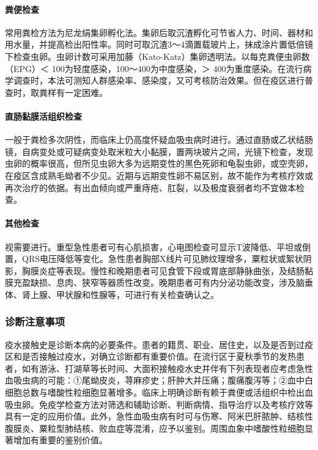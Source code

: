 \paragraph{粪便检查}

常用粪检方法为尼龙绢集卵孵化法。集卵后取沉渣孵化可节省人力、时间、器材和用水量，并提高检出阳性率。同时可取沉渣3～4滴置载玻片上，抹成涂片置低倍镜下检查虫卵。虫卵计数可采用加藤（Kato-Katz）集卵透明法。以每克粪便虫卵数（EPG）＜
100为轻度感染，100～400为中度感染，＞
400为重度感染。在流行病学调查时，本法可测知人群感染率、感染度，又可考核防治效果。但在疫区进行普查时，取粪样有一定困难。

\paragraph{直肠黏膜活组织检查}

一般于粪检多次阴性，而临床上仍高度怀疑血吸虫病时进行。通过直肠或乙状结肠镜，自病变处或可疑病变处取米粒大小黏膜，置两块玻片之间，光镜下检查，发现虫卵的概率很高，但所见虫卵大多为远期变性的黑色死卵和龟裂虫卵，或空壳卵，在疫区含成熟毛蚴者不少见。近期与远期变性卵不易区别，故不能作为考核疗效或再次治疗的依据。有出血倾向或严重痔疮、肛裂，以及极度衰弱者均不宜做本检查。

\paragraph{其他检查}

视需要进行。重型急性患者可有心肌损害，心电图检查可显示T波降低、平坦或倒置，QRS电压降低等变化。急性患者胸部X线片可见肺纹理增多，粟粒状或絮状阴影，胸膜炎症等表现。慢性和晚期患者可见食管下段或胃底部静脉曲张，及结肠黏膜充盈缺损、息肉、狭窄等器质性改变。晚期患者可有内分泌功能改变，涉及脑垂体、肾上腺、甲状腺和性腺等，可进行有关检查确认之。

\subsubsection{诊断注意事项}

疫水接触史是诊断本病的必要条件。患者的籍贯、职业、居住史，以及是否到过疫区和是否接触过疫水，对确立诊断都有重要价值。在流行区于夏秋季节的发热患者，如有游泳、打湖草等长时间、大面积接触疫水史并伴有下列表现者应考虑急性血吸虫病的可能：①尾蚴皮炎，荨麻疹史；肝肿大并压痛；腹痛腹泻等；②血中白细胞总数与嗜酸性粒细胞显著增多。临床上明确诊断有赖于粪便或活组织中检出血吸虫卵。免疫学检查方法对筛选和辅助诊断、判断病情、指导治疗以及考核疗效等具有一定的应用价值。此外，急性血吸虫病有时可与伤寒、阿米巴肝脓肿、结核性腹膜炎、粟粒型肺结核、败血症等混淆，应予以鉴别。周围血象中嗜酸性粒细胞显著增加有重要的鉴别价值。

